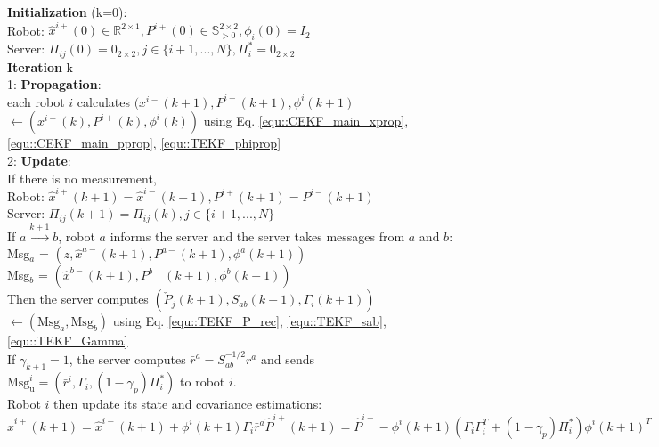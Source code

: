 \documentclass[conference]{IEEEtran}
\begin{document}
\begin{algorithm}
	\textbf{Initialization} (k=0):\\
	Robot: $\hat{x}^{i+}(0)\in\mathbb{R}^{2\times1}, P^{i+}(0)\in\mathbb{S}^{2\times2}_{>0},\phi_i(0) = I_2$\\
	Server: $\Pi_{ij}(0) = 0_{2\times2},j\in\{i+1,...,N\}, \Pi_i^* = 0_{2\times2}$\\
	\textbf{Iteration} k\\
	1: \textbf{Propagation}: \\each robot $i$ calculates $(x^{i-}(k+1),P^{i-}(k+1),\phi^i(k+1)$ \\$\longleftarrow (x^{i+}(k),P^{i+}(k),\phi^i(k))$ using Eq. \eqref{equ::CEKF_main_xprop}, \eqref{equ::CEKF_main_pprop}, \eqref{equ::TEKF_phiprop} \vspace{1ex}\\
	2: \textbf{Update}:\\
	If there is no measurement,\\
	Robot: $\hat{x}^{i+}(k+1)=\hat{x}^{i-}(k+1), P^{i+}(k+1)=P^{i-}(k+1)$\\
	Server: $\Pi_{ij}(k+1) = \Pi_{ij}(k),j\in\{i+1,...,N\}$ \vspace{1ex}\\
	If $a\overset{k+1}{\longrightarrow}b$, robot $a$ informs the server and the server takes messages from $a$ and $b$:\\
	Msg$_a$ = $(z,\hat{x}^{a-}(k+1),P^{a-}(k+1),\phi^a(k+1))$ \\
	Msg$_b$ = $(\hat{x}^{b-}(k+1),P^{b-}(k+1),\phi^b(k+1))$ \vspace{0.5ex}\\
	Then the server computes $(\check{P}_j(k+1),S_{ab}(k+1),\Gamma_i(k+1))$ $\longleftarrow (\text{Msg}_a,\text{Msg}_b)$ using Eq. \eqref{equ::TEKF_P_rec}, \eqref{equ::TEKF_sab}, \eqref{equ::TEKF_Gamma} \vspace{0.5ex} \\
	If $\gamma_{k+1} = 1$, the server computes $\bar{r}^a = S_{ab}^{-1/2}r^a$ and sends $\text{Msg}_\text{u}^i = (\bar{r}^i,\Gamma_i,(1-\gamma_{p})\Pi_i^*)$ to robot $i$.\\
	Robot $i$ then update its state and covariance estimations:
	\begin{subequations}
		\begin{equation}
		\hat{x}^{i+}(k+1) = \hat{x}^{i-}(k+1) + \phi^i(k+1)\Gamma_i\bar{r}^a
		\end{equation}
		\begin{equation}
		\hat{P}^{i+}(k+1) = \hat{P}^{i-} - \phi^i(k+1)(\Gamma_i\Gamma_i^T+(1-\gamma_{p})\Pi_i^*)\phi^i(k+1)^T

\end{equation}
\end{subequations}
\end{algorithm}
\end{document}
